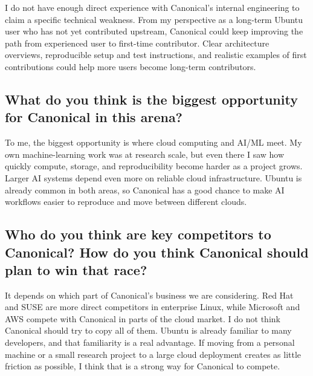 \documentclass[11pt]{article}
\begin{document}
I do not have enough direct experience with Canonical's internal engineering to claim a specific technical weakness. From my perspective as a long-term Ubuntu user who has not yet contributed upstream, Canonical could keep improving the path from experienced user to first-time contributor. Clear architecture overviews, reproducible setup and test instructions, and realistic examples of first contributions could help more users become long-term contributors.

\subsection*{What do you think is the biggest opportunity for Canonical in this arena?}

To me, the biggest opportunity is where cloud computing and AI/ML meet. My own machine-learning work was at research scale, but even there I saw how quickly compute, storage, and reproducibility become harder as a project grows. Larger AI systems depend even more on reliable cloud infrastructure. Ubuntu is already common in both areas, so Canonical has a good chance to make AI workflows easier to reproduce and move between different clouds.

\subsection*{Who do you think are key competitors to Canonical? How do you think Canonical should plan to win that race?}

It depends on which part of Canonical's business we are considering. Red Hat and SUSE are more direct competitors in enterprise Linux, while Microsoft and AWS compete with Canonical in parts of the cloud market. I do not think Canonical should try to copy all of them. Ubuntu is already familiar to many developers, and that familiarity is a real advantage. If moving from a personal machine or a small research project to a large cloud deployment creates as little friction as possible, I think that is a strong way for Canonical to compete.
\end{document}
